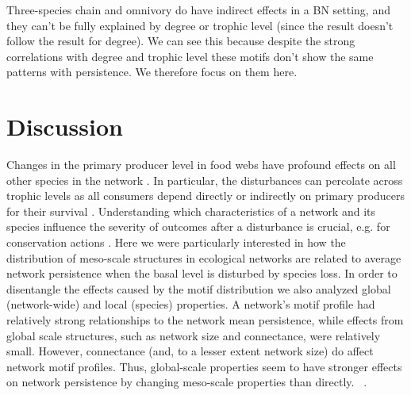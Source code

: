 \documentclass[12pt]{article}
\begin{document}
\begin{spacing}{2.0}
Three-species chain and omnivory do have indirect effects in a BN setting, and they can't be fully explained by degree or trophic level (since the result doesn't follow the result for degree). We can see this because despite the strong correlations with degree and trophic level these motifs don't show the same patterns with persistence. We therefore focus on them here.


\section*{Discussion}


Changes in the primary producer level in food webs have profound effects on all other species in the network \citep{}. In particular, the disturbances can percolate across trophic levels as all consumers depend directly or indirectly on primary producers for their survival \citep{}. Understanding which characteristics of a network and its species influence the severity of outcomes after a disturbance is crucial, e.g. for conservation actions \citep{}. 
Here we were particularly interested in how the distribution of meso-scale structures in ecological networks are related to average network persistence when the basal level is disturbed by species loss. In order to disentangle the effects caused by the motif distribution we also analyzed global (network-wide) and local (species) properties.
A network's motif profile had relatively strong relationships to the network mean persistence, while effects from global scale structures, such as network size and connectance, were relatively small. 
However, connectance (and, to a lesser extent network size) do affect network motif profiles. Thus, global-scale properties seem to have stronger effects on network persistence by changing meso-scale properties than directly. ~\citep{prill2005dynamic, bascompte2005simple}.


\end{spacing}
\end{document}
